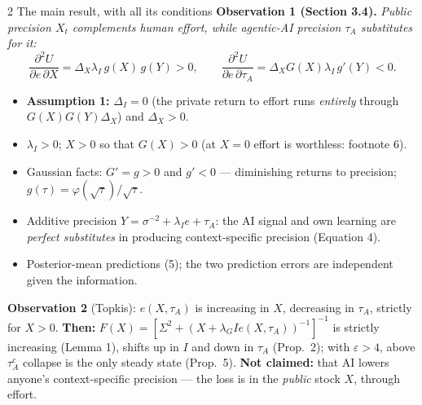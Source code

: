 \documentclass[aspectratio=169,11pt]{beamer}
\begin{document}
\begin{frame}{2 \textperiodcentered{} The main result, with all its conditions}
  \footnotesize
  \textbf{Observation 1 (Section 3.4).} \emph{Public precision $X_t$ complements human effort, while agentic-AI
  precision $\tau_A$ substitutes for it:}
  \[
    \frac{\partial^2 U}{\partial e\,\partial X}=\Delta_X\lambda_I\,g(X)\,g(Y)>0,
    \qquad
    \frac{\partial^2 U}{\partial e\,\partial\tau_A}=\Delta_X G(X)\lambda_I\,g'(Y)<0 .
  \]
  \begin{itemize}
    \item[(i)] \textbf{Assumption 1:} $\Delta_I=0$ (the private return to effort runs \emph{entirely} through
      $G(X)G(Y)\Delta_X$) and $\Delta_X>0$.
    \item[(ii)] $\lambda_I>0$; $X>0$ so that $G(X)>0$ (at $X=0$ effort is worthless: footnote 6).
    \item[(iii)] Gaussian facts: $G'=g>0$ and $g'<0$ --- diminishing returns to precision; $g(\tau)=\varphi(\sqrt\tau)/\sqrt\tau$.
    \item[(iv)] Additive precision $Y=\sigma^{-2}+\lambda_I e+\tau_A$: the AI signal and own learning are
      \emph{perfect substitutes} in producing context-specific precision (Equation 4).
    \item[(v)] Posterior-mean predictions (5); the two prediction errors are independent given the information.
  \end{itemize}
  \textbf{Observation 2} (Topkis): $e(X,\tau_A)$ is increasing in $X$, decreasing in $\tau_A$, strictly for $X>0$.
  \textbf{Then:} $F(X)=[\Sigma^2+(X+\lambda_G I e(X,\tau_A))^{-1}]^{-1}$ is strictly increasing (Lemma 1), shifts up
  in $I$ and down in $\tau_A$ (Prop.\ 2); with $\varepsilon>4$, above $\tau_A^c$ collapse is the only steady state
  (Prop.\ 5). \textbf{Not claimed:} that AI lowers anyone's context-specific precision --- the loss is in the
  \emph{public} stock $X$, through effort.
\end{frame}
\end{document}
